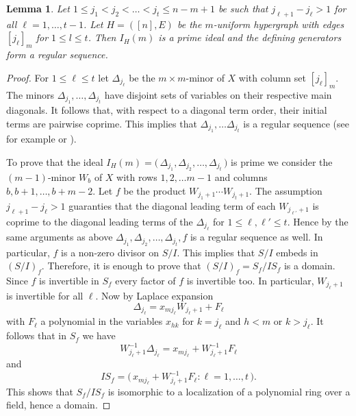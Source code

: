 \documentclass{amsart}
\newtheorem{lemma}[theorem]{Lemma}
\theoremstyle{definition}
\numberwithin{equation}{section}
\begin{document}
\begin{lemma}
\label{complete}
  Let $1\leq j_1<j_2<\dots <j_t \leq n-m+1$ be such that $j_{\ell+1}-j_\ell>1$ for all $\ell=1,\dots, t-1$. 
  Let $H = ([n],E)$ be the $m$-uniform hypergraph with 
  edges $[j_\ell]_m$ for $1 \leq l \leq t$.
  Then $I_H(m)$ is a prime ideal and the
  defining generators form a regular sequence. 
 
\end{lemma}
\begin{proof}
 For $1 \leq \ell \leq t$ let $\Delta_{j_\ell}$ be the $m \times m$-minor of $X$ with column set $[j_\ell]_m$. 
 The minors $\Delta_{j_1}, \ldots ,
 \Delta_{j_t}$ have disjoint sets of
 variables on their respective main diagonals.
 It follows that, with respect to a diagonal term order, their initial terms are pairwise coprime. This implies that 
 $\Delta_{j_1}, \ldots \Delta_{j_t}$ is
 a regular sequence (see for example  \cite[Proposition 1.2.12]{BCRV}  or \cite[Problem 3.1, p.50]{monomialidealsbook}).  

 To prove that the ideal $I_H(m) =\big(\,\Delta_{j_1}, \Delta_{j_2},\dots, \Delta_{j_t}\,\big)$ is prime we consider the $(m-1)$-minor $W_b$ of $X$ with rows $1,2,\dots m-1$ and columns $b,b+1,\dots,b+m-2$. Let $f$ be the product $W_{j_1+1}
 \cdots W_{j_t+1}$. The assumption $j_{\ell+1}-j_\ell>1$ guaranties that the diagonal leading term of each $W_{j_{\ell'}+1}$ is coprime to 
 the diagonal leading terms of the $\Delta_{j_\ell}$ for $1 \leq \ell,\ell'\leq t$. Hence by the same arguments as above 
 $\Delta_{j_1}, \Delta_{j_2},\ldots, \Delta_{j_t},f$ is a regular sequence as well.  In particular, $f$ is a non-zero divisor on $S/I$. This implies that $S/I$ embeds in $(S/I)_f$. Therefore, it is enough to prove that $(S/I)_f=S_f/IS_f$ is a domain. Since $f$ is invertible in $S_f$ every factor of $f$ is invertible too.
 In particular, $W_{j_\ell+1}$ is invertible for all $\ell$. 
Now by Laplace expansion 
$$\Delta_{j_\ell}=x_{mj_\ell}W_{j_\ell+1}+F_\ell$$ 
with $F_\ell$ a polynomial in the variables $x_{hk}$ for $k=j_\ell$ and $h<m$ or $k>j_\ell$. It follows that in $S_f$ we have 
$$W_{j_\ell+1}^{-1}\Delta_{j_\ell}=x_{mj_\ell}+W_{j_\ell+1}^{-1}F_\ell$$ 
and 
$$IS_f=\big(\,x_{mj_\ell}+W_{j_\ell+1}^{-1}F_\ell : \ell=1,\dots,t \,\big).$$
This shows that $S_f/IS_f$ is isomorphic to a localization of a polynomial ring over a field, hence a domain.  
\end{proof}
\end{document}
